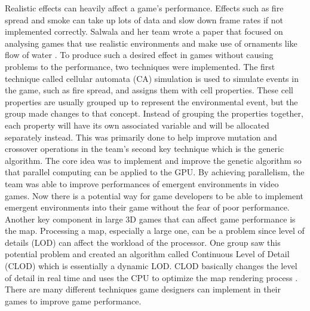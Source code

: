 \documentclass{article}
\begin{document}
Realistic effects can heavily affect a game’s performance. Effects such as fire spread and smoke can take up lots of data and slow down frame rates if not implemented correctly. Salwala and her team wrote a paper that focused on analysing games that use realistic environments and make use of ornaments like flow of water \cite{5564465}. To produce such a desired effect in games without causing problems to the performance, two techniques were implemented. The first technique called cellular automata (CA) simulation is used to simulate events in the game, such as fire spread, and assigns them with cell properties. These cell properties are usually grouped up to represent the environmental event, but the group made changes to that concept. Instead of grouping the properties together, each property will have its own associated variable and will be allocated separately instead. This was primarily done to help improve mutation and crossover operations in the team's second key technique which is the generic algorithm. The core idea was to implement and improve the genetic algorithm so that parallel computing can be applied to the GPU. By achieving parallelism, the team was able to improve performances of emergent environments in video games. Now there is a potential way for game developers to be able to implement emergent environments into their game without the fear of poor performance. Another key component in large 3D games that can affect game performance is the map. Processing a map, especially a large one, can be a problem since level of details (LOD) can affect the workload of the processor. One group saw this potential problem and created an algorithm called Continuous Level of Detail (CLOD) which is essentially a dynamic LOD. CLOD basically changes the level of detail in real time and uses the CPU to optimize the map rendering process \cite{9081835}. There are many different techniques game designers can implement in their games to improve game performance. 
\end{document}
